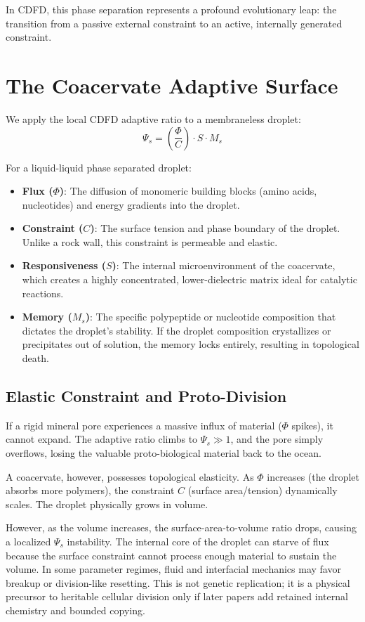 \documentclass[11pt,a4paper]{article}
\begin{document}
In CDFD, this phase separation represents a profound evolutionary leap: the transition from a passive external constraint to an active, internally generated constraint.

\section{The Coacervate Adaptive Surface}
We apply the local CDFD adaptive ratio to a membraneless droplet:
\begin{equation}
 \Psi_s = \left( \frac{\Phi}{C} \right) \cdot S \cdot M_s
\end{equation}

For a liquid-liquid phase separated droplet:
\begin{itemize}
 \item \textbf{Flux ($\Phi$)}: The diffusion of monomeric building blocks (amino acids, nucleotides) and energy gradients into the droplet.
 \item \textbf{Constraint ($C$)}: The surface tension and phase boundary of the droplet. Unlike a rock wall, this constraint is permeable and elastic.
 \item \textbf{Responsiveness ($S$)}: The internal microenvironment of the coacervate, which creates a highly concentrated, lower-dielectric matrix ideal for catalytic reactions.
 \item \textbf{Memory ($M_s$)}: The specific polypeptide or nucleotide composition that dictates the droplet's stability. If the droplet composition crystallizes or precipitates out of solution, the memory locks entirely, resulting in topological death.
\end{itemize}

\subsection{Elastic Constraint and Proto-Division}
If a rigid mineral pore experiences a massive influx of material ($\Phi$ spikes), it cannot expand. The adaptive ratio climbs to $\Psi_s \gg 1$, and the pore simply overflows, losing the valuable proto-biological material back to the ocean.

A coacervate, however, possesses topological elasticity. As $\Phi$ increases (the droplet absorbs more polymers), the constraint $C$ (surface area/tension) dynamically scales. The droplet physically grows in volume. 

However, as the volume increases, the surface-area-to-volume ratio drops, causing a localized $\Psi_s$ instability. The internal core of the droplet can starve of flux because the surface constraint cannot process enough material to sustain the volume. In some parameter regimes, fluid and interfacial mechanics may favor breakup or division-like resetting. This is not genetic replication; it is a physical precursor to heritable cellular division only if later papers add retained internal chemistry and bounded copying.
\end{document}
